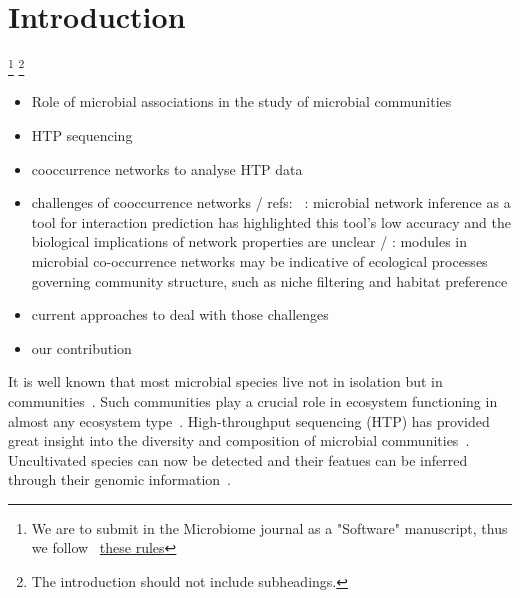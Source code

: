 \documentclass[sn-mathphys,Numbered, lineno]{sn-jnl}  %
\theoremstyle{thmstyleone}%
\theoremstyle{thmstyletwo}%
\theoremstyle{thmstylethree}%
\begin{document}

\section{Introduction}
\label{sec1}

    \footnote{
        We are to submit in the Microbiome journal as a "Software" manuscript, thus we follow
        ~\href{https://microbiomejournal.biomedcentral.com/submission-guidelines/preparing-your-manuscript/software-article}{these rules}
    }
    \footnote{The introduction should not include subheadings.}

    \hrulefill
    \begin{itemize}
        \item Role of microbial associations in the study of microbial communities
        \item HTP sequencing 
        \item cooccurrence networks to analyse HTP data
        \item challenges of cooccurrence networks / refs:
            ~\cite{berry2014deciphering}: microbial network inference as a tool for interaction prediction has highlighted this tool’s low accuracy and the biological implications of network properties are unclear /
            \cite{ma2020earth} :  modules in microbial co-occurrence networks may be indicative of ecological processes governing community structure, such as niche filtering and habitat preference
        
        \item current approaches to deal with those challenges
        \item our contribution 
    \end{itemize}

    \hrulefill

    It is well known that most microbial species live not in isolation but in communities~\cite{rottjers2018hairballs}.
    Such communities play a crucial role in ecosystem functioning in almost any ecosystem type~\cite{raes2008molecular, faust2012microbialReviewInteractions}.
    High-throughput sequencing (HTP) has provided great insight into the diversity and composition of microbial communities~\cite{elixir_microbiome}. %
    Uncultivated species can now be detected and their featues can be inferred through their genomic information~\cite{hug2016new}.
\end{document}
